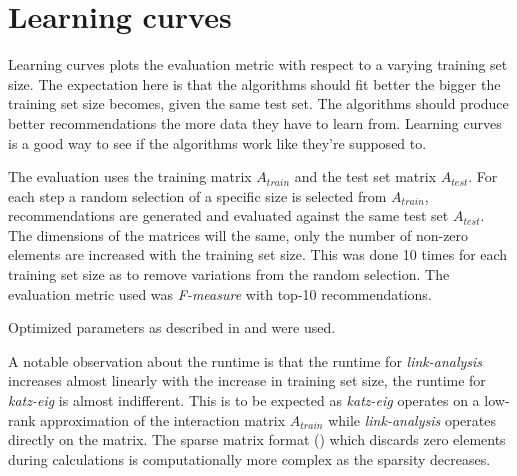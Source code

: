 
\section{Learning curves}\label{sec:graphs:learning_curves}

Learning curves plots the evaluation metric with respect to a varying training set size. The expectation here is that the algorithms should fit better the bigger the training set size becomes, given the same test set. The algorithms should produce better recommendations the more data they have to learn from. Learning curves is a good way to see if the algorithms work like they're supposed to.

The evaluation uses the training matrix $A_{train}$ and the test set matrix $A_{test}$. For each step a random selection of a specific size is selected from $A_{train}$, recommendations are generated and evaluated against the same test set $A_{test}$. The dimensions of the matrices will the same, only the number of non-zero elements are increased with the training set size. This was done 10 times for each training set size as to remove variations from the random selection. The evaluation metric used was \textit{F-measure} with top-10 recommendations.

Optimized parameters as described in  and  were used.


A notable observation about the runtime is that the runtime for \textit{link-analysis} increases almost linearly with the increase in training set size, the runtime for \textit{katz-eig} is almost indifferent. This is to be expected as \textit{katz-eig} operates on a low-rank approximation of the interaction matrix $A_{train}$ while \textit{link-analysis} operates directly on the matrix. The sparse matrix format () which discards zero elements during calculations is computationally more complex as the sparsity decreases.

\FloatBarrier
